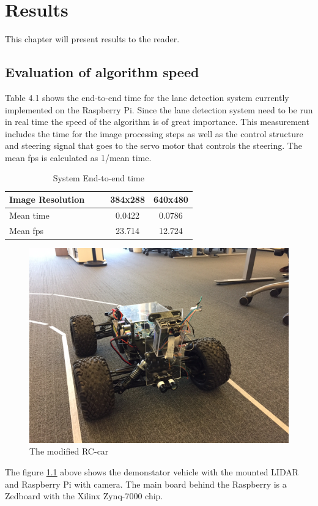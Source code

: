 \chapter{Results}
\label{sec:results}

This chapter will present results to the reader.


\section{Evaluation of algorithm speed}
Table 4.1 shows the end-to-end time for the lane detection system currently implemented on the Raspberry Pi. Since the lane detection system need to be run in real time the speed of the algorithm is of great importance. This measurement includes the time for the image processing steps as well as the control structure and steering signal that goes to the servo motor that controls the steering. The mean fps is calculated as 1/mean time.


\begin{table}[H]
\centering
\caption{System End-to-end time}
\label{End-to-end time}
\begin{tabular}{@{} l *4c @{}}
\toprule
Image Resolution   & & & 384x288 & 640x480  \\ 
\midrule
 Mean time & & & 0.0422 & 0.0786 \\ 
 Mean fps & & & 23.714 & 12.724 \\
\bottomrule
 \end{tabular}
\end{table}



\begin{figure}[H]
  \includegraphics[width=\textwidth]{./img/utor.JPG}
  \centering
  \caption{The modified RC-car}
  \label{fig:The modified RC-car used for demonstrator}
\end{figure}

The figure \ref{fig:The modified RC-car used for demonstrator} above shows the demonstator vehicle with the mounted LIDAR and Raspberry Pi with camera. The main board behind the Raspberry is a Zedboard with the Xilinx Zynq-7000 chip.